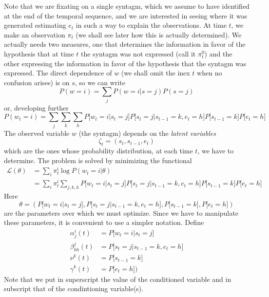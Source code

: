 \documentclass[10pt]{article}
\def\emph{\textsl}
\def\st{s}
\def\ev{e}
\begin{document}
Note that we are fixating on a single syntagm, which we assume to have
identified at the end of the temporal sequence, and we are interested
in seeing where it was generated estimating $\ev_t$ in such a way to
explain the observations. At time $t$, we make an observation $\pi_t$
(we shall see later how this is actually determined). We actually
needs two measures, one that determines the information in favor of
the hypothesis that at time $t$ the syntagm was not expressed (call it
$\pi_t^0$) and the other expressing the information in favor of the
hypothesis that the syntagm was expressed. The direct dependence of
$w$ (we shall omit the inex $t$ when no confusion arises) is on $\st$,
so we can write
%
%
\begin{equation}
  P(w=i) = \sum_j P(w=i|\st=j)P(\st=j)
\end{equation}
%
%
or, developing further
%
%
\begin{equation}
  P(w_t=i) = \sum_j \sum_k \sum_h P\bigl[w_t=i\bigl|\st_t=j\bigr]P\bigl[\st_t=j\bigl|\st_{t-1}=k,\ev_t=h\bigr]P\bigl[\st_{t-1}=k\bigr]P\bigl[\ev_t=h\bigl]
\end{equation}
%
%
The observed variable $w$ (the syntagm) depends on the \emph{latent
  variables}
%
%
\begin{equation}
  \zeta_t = (\st_t, \st_{t-1}, \ev_t)
\end{equation}
%
%
which are the ones whose probability distribution, at each time $t$,
we have to determine. The problem is solved by minimizing the functional
%
%
\begin{equation}
  \begin{aligned}
    {\mathcal{L}}(\theta) &= \sum_i \pi_t^i \log P(w_t=i|\theta) \\
    &= \sum_i \pi_t^i \sum_{j,k,h} P\bigl[w_t=i\bigl|\st_t=j\bigr]P\bigl[\st_t=j\bigl|\st_{t-1}=k,\ev_t=h\bigr]P\bigl[\st_{t-1}=k\bigr]P\bigl[\ev_t=h\bigl]
  \end{aligned}
\end{equation}
%
%
Here
%
%
\begin{equation}
  \theta = (P\bigl[w_t=i\bigl|\st_t=j\bigr], P\bigl[\st_t=j\bigl|\st_{t-1}=k,\ev_t=h\bigr], P\bigl[\st_{t-1}=k\bigr], P\bigl[\ev_t=h\bigl])
\end{equation}
%
%
are the parameters over which we must optimize. Since we have to
manipulate these parameters, it is convenient to use a simpler
notation. Define
%
%
\begin{equation}
  \begin{aligned}
    \alpha_j^i(t) &= P\bigl[w_t=i\bigl|\st_t=j\bigr] \\
    \beta_{kh}^j(t) &= P\bigl[\st_t=j\bigl|\st_{t-1}=k,\ev_t=h\bigr] \\
    \nu^k(t) &= P\bigl[\st_{t-1}=k\bigr] \\
    \gamma^k(t) &= P\bigl[\ev_t=h\bigl])
  \end{aligned}
\end{equation}
%
%
Note that we put in superscript the value of the conditioned variable
and in subscript that of the condintioning variable(s). 
\end{document}
